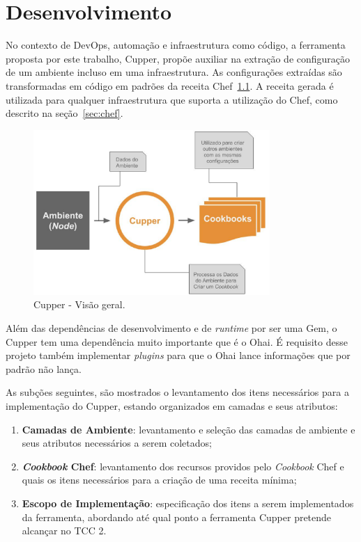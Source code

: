 \newpage\null\thispagestyle{empty}\newpage
\chapter{Desenvolvimento}
\label{chap:desenv}

No contexto de DevOps, automação e infraestrutura como código, a ferramenta
proposta por este trabalho, Cupper, propõe auxiliar na extração de configuração
de um ambiente incluso em uma infraestrutura. As configurações extraídas são
transformadas em código em padrões da receita Chef~\ref{fig:cupper_geral}. A
receita gerada é utilizada para qualquer infraestrutura que suporta a
utilização do Chef, como descrito na seção~\ref{sec:chef}.

\begin{figure}[H]
  \centering
  \caption{Cupper - Visão geral.}
  \label{fig:cupper_geral}
  \includegraphics[width=0.8\textwidth]{figuras/cupper_geral.eps}
\end{figure}

Além das dependências de desenvolvimento e de \textit{runtime} por ser uma Gem,
o Cupper tem uma dependência muito
importante que é o Ohai. É requisito desse projeto também implementar
\textit{plugins} para que o Ohai lance informações que por padrão 
não lança.

As subções seguintes, são mostrados o levantamento dos itens necessários para
a implementação do Cupper, estando organizados em camadas e seus atributos:

\begin{enumerate}
  \item \textbf{Camadas de Ambiente}: levantamento e seleção das camadas de ambiente
    e seus atributos necessários a serem coletados;
  \item \textbf{\textit{Cookbook} Chef}: levantamento dos recursos providos pelo \textit{Cookbook} Chef e quais os
    itens necessários para a criação de uma receita mínima;
  \item \textbf{Escopo de Implementação}: especificação dos itens a serem implementados
    da ferramenta, abordando até qual ponto a ferramenta Cupper pretende alcançar
    no TCC 2.
\end{enumerate}




